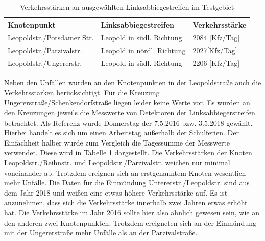 \begin{table}[htpb]
	\scriptsize
	\caption[Verkehrsstärken an ausgewählten Linksabbiegestreifen im Testgebiet]{Verkehrsstärken an ausgewählten Linksabbiegestreifen im Testgebiet}\label{tab:Linksabbieger}
	\centering
	\begin{tabular}{l p{3cm} p{3cm} }
		\toprule
		Knotenpunkt & Linksabbiegestreifen & Verkehrsstärke \\
		\midrule
		Leopoldstr./Potsdamer Str. & Leopold in südl. Richtung & 2084 [Kfz/Tag] \\
		Leopoldstr./Parzivalstr. & Leopold in nördl. Richtung & 2027[Kfz/Tag] \\
		Leopoldstr./Ungererstr. & Leopold in südl. Richtung & 2206 [Kfz/Tag] \\
		\bottomrule
	\end{tabular}
\end{table}

Neben den Unfällen wurden an den Knotenpunkten in der Leopoldstraße auch die Verkehrsstärken berücksichtigt. Für die Kreuzung Ungererstraße/Schenkendorfstraße liegen leider keine Werte vor. Es wurden an den Kreuzungen jeweils die Messwerte von Detektoren der Linksabbiegerstreifen betrachtet. Als Referenz wurde Donnerstag der 7.5.2016 bzw. 3.5.2018 gewählt. Hierbei handelt es sich um einen Arbeitstag außerhalb der Schulferien. Der Einfachheit halber wurde zum Vergleich die Tagessumme der Messwerte verwendet. Diese wird in Tabelle \ref{tab:Linksabbieger} dargestellt. Die Verkehrsstärken der Knoten Leopoldstr./Reihnstr. und Leopoldstr./Parzivalstr. weichen nur minimal voneinander ab. Trotzdem ereignen sich an erstgenanntem Knoten wesentlich mehr Unfälle. Die Daten für die Einmündung Untererstr./Leopoldstr. sind aus dem Jahr 2018 und weißen eine etwas höhere Verkehrsstärke auf. Es ist anzunehmen, dass sich die Verkehrsstärke innerhalb zwei Jahren etwas erhöht hat. Die Verkehrsstärke im Jahr 2016 sollte hier also ähnlich gewesen sein, wie an den anderen zwei Knotenpunkten. Trotzdem ereigneten sich an der Einmündung mit der Ungererstraße mehr Unfälle als an der Parzivalstraße. 
 
